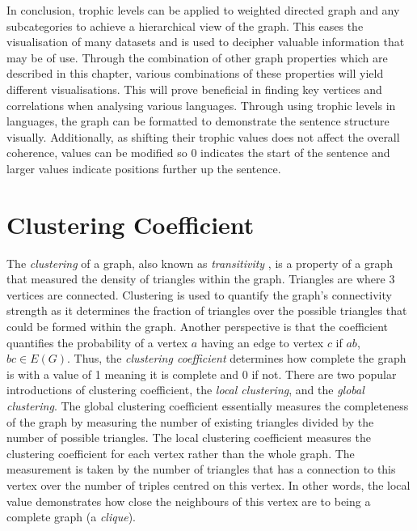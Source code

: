 In conclusion, trophic levels can be applied to weighted directed graph and any subcategories to achieve a hierarchical view of the graph. This eases the visualisation of many datasets and is used to decipher valuable information that may be of use. Through the combination of other graph properties which are described in this chapter, various combinations of these properties will yield different visualisations. This will prove beneficial in finding key vertices and correlations when analysing various languages. Through using trophic levels in languages, the graph can be formatted to demonstrate the sentence structure visually. Additionally, as shifting their trophic values does not affect the overall coherence, values can be modified so 0 indicates the start of the sentence and larger values indicate positions further up the sentence.

\section{Clustering Coefficient}
The \emph{clustering} of a graph, also known as \emph{transitivity} \cite{schank2005approximating}, is a property of a graph that measured the density of triangles within the graph. Triangles are where 3 vertices are connected. Clustering is used to quantify the graph's connectivity strength as it determines the fraction of triangles over the possible triangles that could be formed within the graph. Another perspective is that the coefficient quantifies the probability of a vertex $a$ having an edge to vertex $c$ if $ab$, $bc \in E(G)$. Thus, the \emph{clustering coefficient} determines how complete the graph is with a value of 1 meaning it is complete and 0 if not. There are two popular introductions of clustering coefficient, the \emph{local clustering}, and the \emph{global clustering}. The global clustering coefficient essentially measures the completeness of the graph by measuring the number of existing triangles divided by the number of possible triangles. The local clustering coefficient measures the clustering coefficient for each vertex rather than the whole graph. The measurement is taken by the number of triangles that has a connection to this vertex over the number of triples centred on this vertex. In other words, the local value demonstrates how close the neighbours of this vertex are to being a complete graph (a \emph{clique}).

